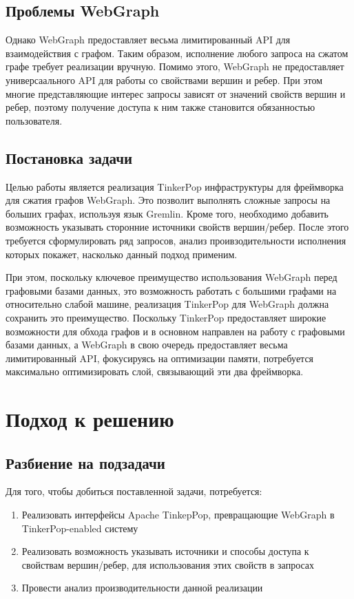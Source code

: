 \documentclass[times,specification,annotation]{itmo-student-thesis}
\begin{document}
\section{Проблемы WebGraph}

Однако WebGraph предоставляет весьма лимитированный API для взаимодействия с графом. Таким образом, исполнение любого запроса на сжатом графе требует реализации вручную. Помимо этого, WebGraph не предоставляет универсаального API для работы со свойствами вершин и ребер. При этом многие представляющие интерес запросы зависят от значений свойств вершин и ребер, поэтому получение доступа к ним также становится обязанностью пользователя.

\section{Постановка задачи}\label{sec:task}

Целью работы является реализация TinkerPop инфраструктуры для фреймворка для сжатия графов WebGraph. Это позволит выполнять сложные запросы на больших графах, используя язык Gremlin. Кроме того, необходимо добавить возможность указывать сторонние источники свойств вершин/ребер. После этого требуется сформулировать ряд запросов, анализ проивзодительности исполнения которых покажет, насколько данный подход применим.

При этом, поскольку ключевое преимущество использования WebGraph перед графовыми базами данных, это возможность работать с большими графами на относительно слабой машине, реализация TinkerPop для WebGraph должна сохранить это преимущество. Поскольку TinkerPop предоставляет широкие возможности для обхода графов и в основном направлен на работу с графовыми базами данных, а WebGraph в свою очередь предоставляет весьма лимитированный API, фокусируясь на оптимизации памяти, потребуется максимально оптимизировать слой, связывающий эти два фреймворка.

\chapter{Подход к решению}

\section{Разбиение на подзадачи}

Для того, чтобы добиться поставленной задачи, потребуется:

\begin{enumerate}
    \item Реализовать интерфейсы Apache TinkepPop, превращающие WebGraph в TinkerPop-enabled систему
    \item Реализовать возможность указывать источники и способы доступа к свойствам вершин/ребер, для использования этих свойств в запросах
    \item Провести анализ производительности данной реализации
\end{enumerate}
\end{document}
